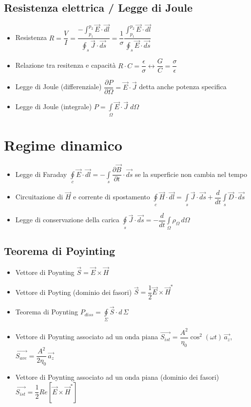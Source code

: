 \documentclass{article}
\begin{document}
\subsection{Resistenza elettrica / Legge di Joule}
\begin{itemize}
	\item Resistenza \(\displaystyle  R = \dfrac{V}{I} = \dfrac{\displaystyle-\int_{p_1}^{p_2} \vec{E} \cdot \vec{dl}}{\displaystyle\oint_s \vec{J} \cdot \vec{ds}} = \dfrac{1}{\sigma} \dfrac{\displaystyle\int_{p_1}^{p_2} \vec{E} \cdot \vec{dl}}{\displaystyle \oint_s \vec{E} \cdot \vec{ds}} \)
	\item Relazione tra resitenza e capacità \(R \cdot C = \dfrac{\epsilon}{\sigma} \leftrightarrow \dfrac{G}{C} = \dfrac{\sigma}{\epsilon} \)
	\item Legge di Joule (differenziale) \( \dfrac{\partial P}{\partial \Omega} = \vec{E} \cdot \vec{J} \) detta anche potenza specifica
	\item Legge di Joule (integrale) \(\displaystyle P = \int\limits_\Omega \vec{E} \cdot \vec{J} \; d\Omega \)
\end{itemize}

\newpage

\section{Regime dinamico}
\begin{itemize}
	\item Legge di Faraday \(\displaystyle \oint\limits_c \vec{E} \cdot \vec{dl} = - \int\limits_s \dfrac{\partial \vec{B}}{\partial t} \cdot \vec{ds} \) se la superficie non cambia nel tempo
	\item Circuitazione di \( \vec{H} \) e corrente di spostamento \(\displaystyle \oint\limits_c \vec{H} \cdot \vec{dl} = \int\limits_s \vec{J} \cdot \vec{ds} + \dfrac{d}{dt} \int\limits_s \vec{D} \cdot \vec{ds} \)
	\item Legge di conservazione della carica \(\displaystyle \oint\limits_s \vec{J} \cdot \vec{ds} = -\dfrac{d}{dt} \int\limits_\Omega \rho_\Omega \, d\Omega \)
	\end{itemize}
	
\subsection{Teorema di Poyinting}
\begin{itemize}
	\item Vettore di Poynting \( \vec{S} = \vec{E} \times \vec{H} \)
	\item Vettore di Poyting (dominio dei fasori) \( \vec{S} = \dfrac{1}{2} \vec{E} \times \vec{H}^{*} \)
	\item Teorema di Poynting \( P_{diss} = \oint\limits_\Sigma \vec{S} \cdot d \,\Sigma \)
	\item Vettore di Poynting associato ad un onda piana \( \vec{S_{ist}} = \dfrac{A^2}{\eta_0} \cos^2{(\omega t)} \, \vec{a_z} \), \( \vec{S_{ave}} = \dfrac{A^2}{2 \eta_0} \, \vec{a_z}\)
	\item Vettore di Poynting associato ad un onda piana (dominio dei fasori) \( \vec{S_{ist}} = \dfrac{1}{2} Re[\vec{E} \times \vec{H}^{*}] \)
\end{itemize}
\end{document}

